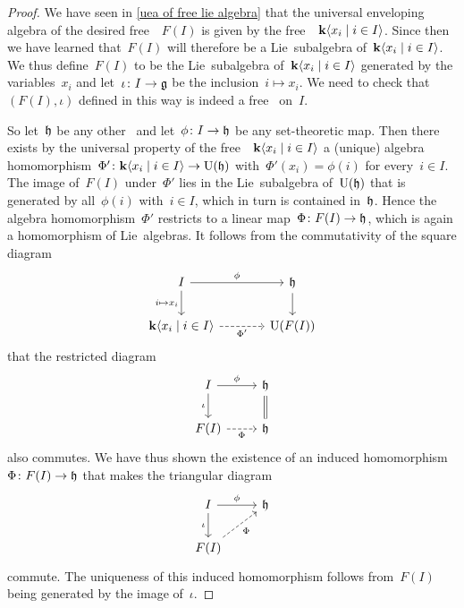\begin{proof}
  We have seen in \cref{uea of free lie algebra} that the universal enveloping algebra of the desired free~{\liealgebra{$\kf$}}~$F(I)$ is given by the free~{\algebra{$\kf$}}~$\kf\gen{x_i \suchthat i \in I}$.
  Since then we have learned that~$F(I)$ will therefore be a Lie~subalgebra of~$\kf\gen{x_i \suchthat i \in I}$.
  We thus define~$F(I)$ to be the Lie~subalgebra of~$\kf\gen{x_i \suchthat i \in I}$ generated by the variables~$x_i$ and let~$\iota \colon I \to \mathfrak{g}$ be the inclusion~$i \mapsto x_i$.
  We need to check that~$(F(I), \iota)$ defined in this way is indeed a free~{\liealgebra{$\kf$}} on~$I$.
  
  So let~$\mathfrak{h}$ be any other~{\liealgebra{$\kf$}} and let~$\phi \colon I \to \mathfrak{h}$ be any set-theoretic map.
  Then there exists by the universal property of the free~{\algebra{$\kf$}}~$\kf\gen{x_i \suchthat i \in I}$ a (unique) algebra homomorphism~$\Phi' \colon \kf\gen{x_i \suchthat i \in I} \to \Univ(\hlie)$ with~$\Phi'(x_i) = \phi(i)$ for every~$i \in I$.
  The image of~$F(I)$ under~$\Phi'$ lies in the Lie~subalgebra of~$\operatorname{U}(\mathfrak{h})$ that is generated by all~$\phi(i)$ with~$i \in I$, which in turn is contained in~$\mathfrak{h}$.
  Hence the algebra homomorphism~$\Phi'$ restricts to a linear map~$\Phi \colon F(I) \to \mathfrak{h}$, which is again a homomorphism of Lie~algebras.
  It follows from the commutativity of the square diagram
  \[
    \begin{tikzcd}[column sep = large]
      I
      \arrow{r}[above]{\phi}
      \arrow{d}[left]{i \mapsto x_i}
      &
      \hlie
      \arrow{d}
      \\
      \kf\gen{x_i \suchthat i \in I}
      \arrow[dashed]{r}[below]{\Phi'}
      &
      \Univ(F(I))
    \end{tikzcd}
  \]
  that the restricted diagram
  \[
    \begin{tikzcd}
      I
      \arrow{r}[above]{\phi}
      \arrow{d}[left]{\iota}
      &
      \hlie
      \arrow[equal]{d}
      \\
      F(I)
      \arrow[dashed]{r}[below]{\Phi}
      &
      \hlie
    \end{tikzcd}
  \]
  also commutes.
  We have thus shown the existence of an induced homomorphism~$\Phi \colon F(I) \to \mathfrak{h}$ that makes the triangular diagram
  \[
    \begin{tikzcd}
      I
      \arrow{d}[left]{\iota}
      \arrow{r}[above]{\phi}
      &
      \hlie
      \\
      F(I)
      \arrow[dashed]{ur}[below right]{\Phi}
      &
      {}
    \end{tikzcd}
  \]
  commute.
  The uniqueness of this induced homomorphism follows from~$F(I)$ being generated by the image of~$\iota$.
\end{proof}


